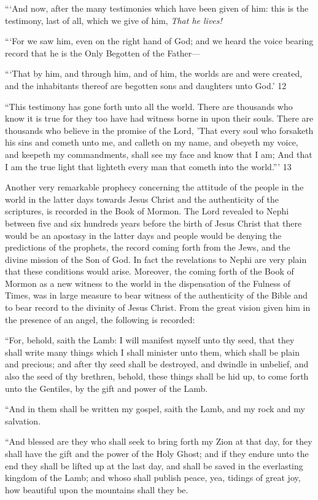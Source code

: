 ```And now, after the many testimonies which have been given of him: this is the testimony,
last of all, which we give of him, \textit{That he lives!}

```For we saw him, even on the right hand of God; and we heard the voice bearing record that
he is the Only Begotten of the Father—

```That by him, and through him, and of him, the worlds are and were created, and the
inhabitants thereof are begotten sons and daughters unto God.' 12

``This testimony has gone forth unto all the world. There are thousands who know it is true
for they too have had witness borne in upon their souls. There are thousands who believe in
the promise of the Lord, 'That every soul who forsaketh his sins and cometh unto me, and
calleth on my name, and obeyeth my voice, and keepeth my commandments, shall see my
face and know that I am; And that I am the true light that lighteth every man that cometh into
the world.''' 13

Another very remarkable prophecy concerning the attitude of the people in the world in the
latter days towards Jesus Christ and the authenticity of the scriptures, is recorded in the Book
of Mormon. The Lord revealed to Nephi between five and six hundreds years before the birth
of Jesus Christ that there would be an apostasy in the latter days and people would be
denying the predictions of the prophets, the record coming forth from the Jews, and the
divine mission of the Son of God. In fact the revelations to Nephi are very plain that these
conditions would arise. Moreover, the coming forth of the Book of Mormon as a new witness
to the world in the dispensation of the Fulness of Times, was in large measure to bear witness
of the authenticity of the Bible and to bear record to the divinity of Jesus Christ. From the
great vision given him in the presence of an angel, the following is recorded:

``For, behold, saith the Lamb: I will manifest myself unto thy seed, that they shall write many
things which I shall minister unto them, which shall be plain and precious; and after thy seed
shall be destroyed, and dwindle in unbelief, and also the seed of thy brethren, behold, these
things shall be hid up, to come forth unto the Gentiles, by the gift and power of the Lamb.

``And in them shall be written my gospel, saith the Lamb, and my rock and my salvation.

``And blessed are they who shall seek to bring forth my Zion at that day, for they shall have
the gift and the power of the Holy Ghost; and if they endure unto the end they shall be lifted
up at the last day, and shall be saved in the everlasting kingdom of the Lamb; and whoso
shall publish peace, yea, tidings of great joy, how beautiful upon the mountains shall they be.

